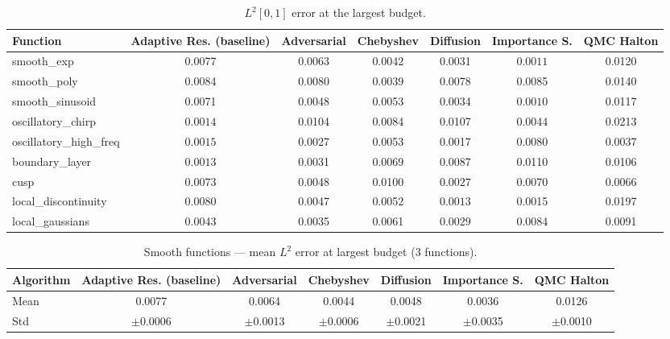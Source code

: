 \begin{table}[htbp]
  \centering
  \caption{$L^2[0,1]$ error at the largest budget.}
  \label{tab:results}
  \small
  \begin{tabular}{@{}lcccccc@{}}
    \toprule
    Function & \textbf{Adaptive Res. (baseline)} & \textbf{Adversarial} & \textbf{Chebyshev} & \textbf{Diffusion} & \textbf{Importance S.} & \textbf{QMC Halton} \\
    \midrule
    smooth\_exp & 0.0077 & 0.0063 & 0.0042 & 0.0031 & $\mathbf{0.0011}$ & 0.0120 \\
    smooth\_poly & 0.0084 & 0.0080 & $\mathbf{0.0039}$ & 0.0078 & 0.0085 & 0.0140 \\
    smooth\_sinusoid & 0.0071 & 0.0048 & 0.0053 & 0.0034 & $\mathbf{0.0010}$ & 0.0117 \\
    oscillatory\_chirp & $\mathbf{0.0014}$ & 0.0104 & 0.0084 & 0.0107 & 0.0044 & 0.0213 \\
    oscillatory\_high\_freq & $\mathbf{0.0015}$ & 0.0027 & 0.0053 & 0.0017 & 0.0080 & 0.0037 \\
    boundary\_layer & $\mathbf{0.0013}$ & 0.0031 & 0.0069 & 0.0087 & 0.0110 & 0.0106 \\
    cusp & 0.0073 & 0.0048 & 0.0100 & $\mathbf{0.0027}$ & 0.0070 & 0.0066 \\
    local\_discontinuity & 0.0080 & 0.0047 & 0.0052 & $\mathbf{0.0013}$ & 0.0015 & 0.0197 \\
    local\_gaussians & 0.0043 & 0.0035 & 0.0061 & $\mathbf{0.0029}$ & 0.0084 & 0.0091 \\
    \bottomrule
  \end{tabular}
\end{table}
\begin{table}[htbp]
  \centering
  \caption{Smooth functions — mean $L^2$ error at largest budget (3 functions).}
  \small
  \begin{tabular}{@{}lcccccc@{}}
    \toprule
    Algorithm & \textbf{Adaptive Res. (baseline)} & \textbf{Adversarial} & \textbf{Chebyshev} & \textbf{Diffusion} & \textbf{Importance S.} & \textbf{QMC Halton} \\
    \midrule
    Mean & 0.0077 & 0.0064 & 0.0044 & 0.0048 & 0.0036 & 0.0126 \\
    Std & $\pm$0.0006 & $\pm$0.0013 & $\pm$0.0006 & $\pm$0.0021 & $\pm$0.0035 & $\pm$0.0010 \\
    \bottomrule
  \end{tabular}
\end{table}
